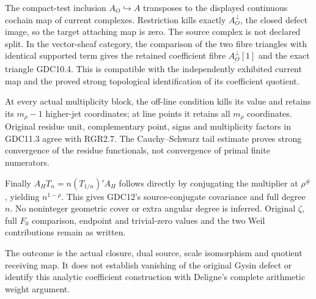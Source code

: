 The compact-test inclusion \(A_O\hookrightarrow A\) transposes to the
displayed continuous cochain map of current complexes. Restriction kills
exactly \(A_O^\perp\), the closed defect image, so the target attaching
map is zero. The source complex is not declared split. In the
vector-sheaf category, the comparison of the two fibre triangles with
identical supported term gives the retained coefficient fibre
\(\underline{A_O^\perp}[1]\) and the exact triangle GDC10.4. This is
compatible with the independently exhibited current map and the proved
strong topological identification of its coefficient quotient.

At every actual multiplicity block, the off-line condition kills its
value and retains its \(m_\rho-1\) higher-jet coordinates; at line
points it retains all \(m_\rho\) coordinates. Original residue unit,
complementary point, signs and multiplicity factors in GDC11.3 agree
with RGR2.7. The Cauchy--Schwarz tail estimate proves strong convergence
of the residue functionals, not convergence of primal finite numerators.

Finally \(A_HT_n=n(T_{1/n})'A_H\) follows directly by conjugating the
multiplier at \(\rho^\#\), yielding \(n^{1-\rho}\). This gives GDC12's
source-conjugate covariance and full degree \(n\). No noninteger
geometric cover or extra angular degree is inferred. Original \(\zeta\),
full \(F_0\) comparison, endpoint and trivial-zero values and the two
Weil contributions remain as written.

The outcome is the actual closure, dual source, scale isomorphism and
quotient receiving map. It does not establish vanishing of the original
Gysin defect or identify this analytic coefficient construction with
Deligne's complete arithmetic weight argument.
